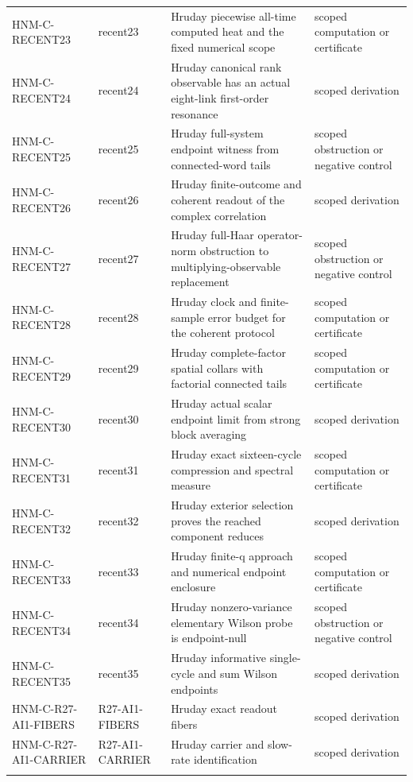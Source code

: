 \begin{longtable}{@{}p{30mm}p{26mm}p{65mm}p{27mm}@{}}
HNM-C-RECENT23 & recent23 & Hruday piecewise all-time computed heat and the fixed numerical scope & scoped computation or certificate\\\addlinespace
HNM-C-RECENT24 & recent24 & Hruday canonical rank observable has an actual eight-link first-order resonance & scoped derivation\\\addlinespace
HNM-C-RECENT25 & recent25 & Hruday full-system endpoint witness from connected-word tails & scoped obstruction or negative control\\\addlinespace
HNM-C-RECENT26 & recent26 & Hruday finite-outcome and coherent readout of the complex correlation & scoped derivation\\\addlinespace
HNM-C-RECENT27 & recent27 & Hruday full-Haar operator-norm obstruction to multiplying-observable replacement & scoped obstruction or negative control\\\addlinespace
HNM-C-RECENT28 & recent28 & Hruday clock and finite-sample error budget for the coherent protocol & scoped computation or certificate\\\addlinespace
HNM-C-RECENT29 & recent29 & Hruday complete-factor spatial collars with factorial connected tails & scoped computation or certificate\\\addlinespace
HNM-C-RECENT30 & recent30 & Hruday actual scalar endpoint limit from strong block averaging & scoped derivation\\\addlinespace
HNM-C-RECENT31 & recent31 & Hruday exact sixteen-cycle compression and spectral measure & scoped computation or certificate\\\addlinespace
HNM-C-RECENT32 & recent32 & Hruday exterior selection proves the reached component reduces & scoped derivation\\\addlinespace
HNM-C-RECENT33 & recent33 & Hruday finite-q approach and numerical endpoint enclosure & scoped computation or certificate\\\addlinespace
HNM-C-RECENT34 & recent34 & Hruday nonzero-variance elementary Wilson probe is endpoint-null & scoped obstruction or negative control\\\addlinespace
HNM-C-RECENT35 & recent35 & Hruday informative single-cycle and sum Wilson endpoints & scoped derivation\\\addlinespace
HNM-C-R27-AI1-FIBERS & R27-AI1-FIBERS & Hruday exact readout fibers & scoped derivation\\\addlinespace
HNM-C-R27-AI1-CARRIER & R27-AI1-CARRIER & Hruday carrier and slow-rate identification & scoped derivation\\\addlinespace

\end{longtable}
